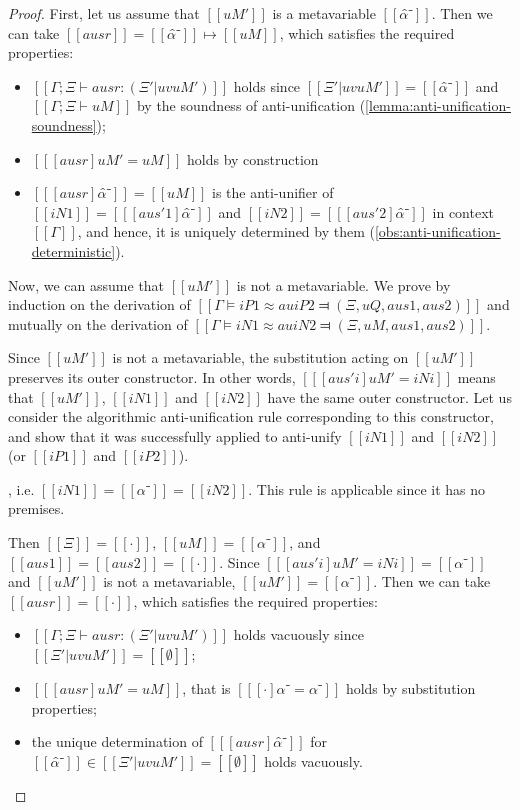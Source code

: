 \begin{proof}
    First, let us assume that $[[uM']]$ is a metavariable $[[α̂⁻]]$. 
    Then we can take $[[ausr]] = [[α̂⁻]] \mapsto [[uM]]$, which satisfies the required properties:
    \begin{itemize}
        \item $[[Γ ; Ξ ⊢ ausr : (Ξ' | uv uM')]]$ holds since 
        $[[Ξ' | uv uM']] = [[{α̂⁻}]]$ and $[[Γ ; Ξ ⊢ uM]]$ by the soundness of anti-unification (\cref{lemma:anti-unification-soundness});
        \item $[[ [ausr] uM' = uM ]]$ holds by construction
        \item $[[ [ausr]α̂⁻]] = [[uM]]$ is the anti-unifier of 
            $[[iN1]] = [[ [aus'1] α̂⁻]]$ and $[[iN2]] = [[ [aus'2] α̂⁻]]$
            in context $[[Γ]]$, and hence, it is uniquely determined by them (\cref{obs:anti-unification-deterministic}).
    \end{itemize}

    Now, we can assume that $[[uM']]$ is not a metavariable. 
    We prove by induction on the derivation of $[[Γ ⊨ iP1 ≈au iP2 ⫤ (Ξ, uQ, aus1, aus2)]]$
    and mutually on the derivation of $[[Γ ⊨ iN1 ≈au iN2 ⫤ (Ξ, uM, aus1, aus2)]]$.

    Since $[[uM']]$ is not a metavariable, 
    the substitution acting on $[[uM']]$ preserves its outer constructor. 
    In other words, 
    $[[ [aus'i] uM' = iNi ]]$ means that $[[uM']]$, 
    $[[iN1]]$ and $[[iN2]]$ have the same outer constructor. 
    Let us consider the algorithmic anti-unification rule corresponding to this constructor, 
    and show that it was successfully applied to anti-unify $[[iN1]]$ and $[[iN2]]$ 
    (or $[[iP1]]$ and $[[iP2]]$).

    \begin{caseof}
        \item {}, i.e. $[[iN1]] = [[α⁻]] = [[iN2]]$.
        \label{case:anti-unification-initial:nvar}
        This rule is applicable since it has no premises. 
        
        Then $[[Ξ]] = [[·]]$, $[[uM]] = [[α⁻]]$, 
        and $[[aus1]] = [[aus2]] = [[·]]$.
        Since $[[ [aus'i] uM' = iNi ]] = [[α⁻]]$
        and $[[uM']]$ is not a metavariable, $[[uM']] = [[α⁻]]$.
        Then we can take $[[ausr]] = [[·]]$, which satisfies the required properties:
        \begin{itemize}
            \item $[[Γ ; Ξ ⊢ ausr : (Ξ' | uv uM')]]$ holds vacuously since 
            $[[Ξ' | uv uM']] = [[∅]]$; 
            \item $[[ [ausr] uM' = uM ]]$, that is $[[ [·] α⁻ = α⁻ ]]$
            holds by substitution properties;
            \item the unique determination of $[[ [ausr]α̂⁻]]$ for $[[α̂⁻]] \in [[Ξ' | uv uM']] = [[∅]]$ holds vacuously.
        \end{itemize}


\end{caseof}
\end{proof}
